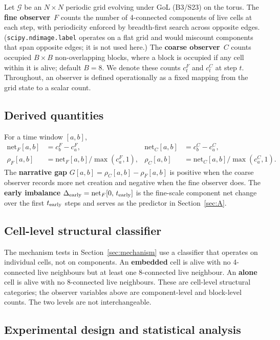 \documentclass[aip,cha,preprint,nofootinbib]{revtex4-2}
\newcommand{\Dearly}{\Delta_{\mathrm{early}}}
\newcommand{\rhoF}{\rho_F}
\newcommand{\rhoC}{\rho_C}
\newcommand{\netF}{\mathrm{net}_F}
\newcommand{\netC}{\mathrm{net}_C}
\begin{document}
Let $\mathcal{G}$ be an $N\times N$ periodic grid evolving under GoL
(B3/S23) on the torus.
The \textbf{fine observer}~$F$ counts the number of 4-connected components
of live cells at each step, with periodicity enforced by breadth-first search
across opposite edges.
(\texttt{scipy.ndimage.label} operates on a flat grid and would miscount
components that span opposite edges; it is not used here.)
The \textbf{coarse observer}~$C$ counts occupied $B\times B$
non-overlapping blocks, where a block is occupied if any cell within it is
alive; default $B=8$.
We denote these counts $c^F_t$ and $c^C_t$ at step $t$.
Throughout, an observer is defined operationally as a fixed mapping from the
grid state to a scalar count.

\subsection{Derived quantities}

For a time window $[a,b]$,
\begin{align}
\netF[a,b] &= c^F_b - c^F_a, &
\netC[a,b] &= c^C_b - c^C_a, \\
\rhoF[a,b] &= \netF[a,b] / \max(c^F_a,1), &
\rhoC[a,b] &= \netC[a,b] / \max(c^C_a,1).
\end{align}
The \textbf{narrative gap} $G[a,b] = \rhoC[a,b] - \rhoF[a,b]$ is positive
when the coarse observer records more net creation and negative when the fine
observer does.
The \textbf{early imbalance} $\Dearly = \netF[0,\,t_{\rm early}]$ is the
fine-scale component net change over the first $t_{\rm early}$ steps and
serves as the predictor in Section~\ref{sec:A}.

\subsection{Cell-level structural classifier}

The mechanism tests in Section~\ref{sec:mechanism} use a classifier that
operates on individual cells, not on components.
An \textbf{embedded} cell is alive with no 4-connected live neighbours but
at least one 8-connected live neighbour.
An \textbf{alone} cell is alive with no 8-connected live neighbours.
These are cell-level structural categories; the observer variables above are
component-level and block-level counts.
The two levels are not interchangeable.

\subsection{Experimental design and statistical analysis}
\end{document}
